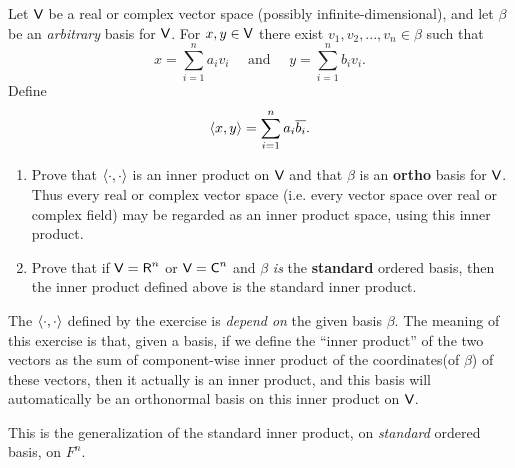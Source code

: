 \begin{exercise} \label{exercise 6.1.22}
Let \(\textsf{V}\) be a real or complex vector space (possibly infinite-dimensional), and let \(\beta\) be an \emph{arbitrary} basis for \(\textsf{V}\).
For \(x, y \in \textsf{V}\) there exist \(v_1, v_2, ..., v_n \in \beta\) such that
\[
    x = \sum_{i = 1}^n a_i v_i \quad \text{ and } \quad y = \sum_{i = 1}^n b_i v_i.
\]
Define
\[
    \left< x, y \right> = \sum_{i = 1}^n a_i \overline{b_i}.
\]
\begin{enumerate}
\item Prove that \(\left< \cdot, \cdot \right>\) is an inner product on \(\textsf{V}\) and that \(\beta\) is an \textbf{ortho} basis for \(\textsf{V}\).
Thus every real or complex vector space (i.e. every vector space over real or complex field) may be regarded as an inner product space, using this inner product.

\item Prove that if \(\textsf{V} = \textsf{R}^n\) or \(\textsf{V} = \textsf{C}^n\) and \(\beta\) \emph{is} the \textbf{standard} ordered basis, then the inner product defined above is the standard inner product.
\end{enumerate}
\end{exercise}

\begin{note}
The \(\left< \cdot, \cdot \right>\) defined by the exercise is \emph{depend on} the given basis \(\beta\).
The meaning of this exercise is that, given a basis, if we define the ``inner product'' of the two vectors as the sum of component-wise inner product of the coordinates(of \(\beta\)) of these vectors,
then it actually is an inner product, and this basis will automatically be an orthonormal basis on this inner product on \(\textsf{V}\).

This is the generalization of the standard inner product, on \emph{standard} ordered basis, on \(F^n\).
\end{note}

